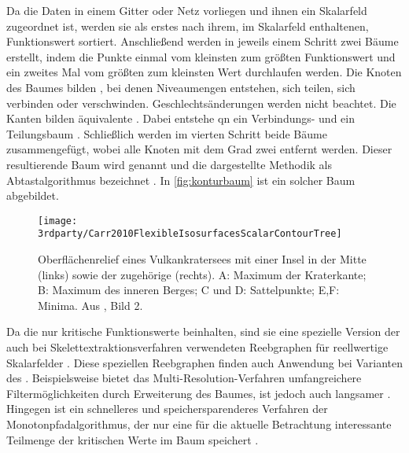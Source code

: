Da die Daten in einem Gitter oder Netz vorliegen und ihnen ein Skalarfeld zugeordnet ist, werden sie als erstes nach ihrem, im Skalarfeld enthaltenen, Funktionswert sortiert. Anschließend werden in jeweils einem Schritt zwei Bäume erstellt, indem die Punkte einmal vom kleinsten zum größten Funktionswert und ein zweites Mal vom größten zum kleinsten Wert durchlaufen werden. Die Knoten des Baumes bilden , bei denen Niveaumengen entstehen, sich teilen, sich verbinden oder verschwinden. Geschlechtsänderungen werden nicht beachtet. Die Kanten bilden äquivalente . Dabei entstehe qn ein Verbindungs- und ein Teilungsbaum \cite{carr2001computingCountourTrees_web}. Schließlich werden im vierten Schritt beide Bäume zusammengefügt, wobei alle Knoten mit dem Grad zwei entfernt werden. Dieser resultierende Baum wird  genannt und die dargestellte Methodik als Abtastalgorithmus bezeichnet \cite{carr2001computingCountourTrees} \cite[S.~176]{chiang2005contourTreesUsingMonotonePaths}. In \autoref{fig:konturbaum} ist ein solcher Baum abgebildet.

\begin{figure}
	\texttt{[image: 3rdparty/Carr2010FlexibleIsosurfacesScalarContourTree]}
	\caption{Oberflächenrelief eines Vulkankratersees mit einer Insel in der Mitte (links) sowie der zugehörige  (rechts). A: Maximum der Kraterkante; B: Maximum des inneren Berges; C und D: Sattelpunkte; E,F: Minima. Aus \cite[S.~44]{carr2010flexibleIsosurfaces}, Bild 2.}\label{fig:konturbaum}
\end{figure}

Da die  nur kritische Funktionswerte beinhalten, sind sie eine spezielle Version der auch bei Skelettextraktionsverfahren verwendeten Reebgraphen \cite{pascucci2007computationReebGraph} für reellwertige Skalarfelder \cite[S.~44]{carr2010flexibleIsosurfaces}. Diese speziellen Reebgraphen finden auch Anwendung bei Varianten des . Beispielsweise bietet das Multi-Resolution-Verfahren umfangreichere Filtermöglichkeiten durch Erweiterung des Baumes, ist jedoch auch langsamer \cite{pascucci2004multiResolutionComputation}. Hingegen ist ein schnelleres und speichersparenderes Verfahren der Monotonpfadalgorithmus, der nur eine für die aktuelle Betrachtung interessante Teilmenge der kritischen Werte im Baum speichert \cite{chiang2005contourTreesUsingMonotonePaths}.

